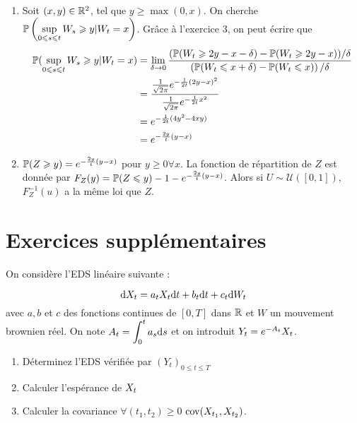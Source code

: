 \begin{enumerate}
\item Soit $(x,y) \in \R^2$, tel que $y \geq \max(0,x)$. On cherche $\dps \P\left(\supu \ws \geq y \vert \wt = x\right)$. Grâce à l'exercice 3, on peut écrire que
\begin{equation*}
\begin{split}
  \P(\supu\ws\geq y \vert \wt = x) &= \lim_{\delta \to 0} \frac{(\P(\wt \geq 2y - x - \delta) - \P(\wt \geq 2y -x))/\delta}{\left(\P(\wt \leq x + \delta) - \P(\wt \leq x)\right)/\delta} \\
  &= \frac{ \frac{1}{\sqrt{2\pi}}e^{- \frac{1}{2t}(2y-x)^2}}{ \frac{1}{\sqrt{2\pi}} e^{- \frac{1}{2t} x^2}} \\
  &= e^{- \frac{1}{2t}(4y^2 - 4xy)} \\
  &= e^{- \frac{2y}{t}(y-x)}
\end{split}
\end{equation*}

\item $\P(Z \geq y) = e^{- \frac{2y}{t}(y-x)}$ pour $y \geq 0 \forall x$. La fonction de répartition de $Z$ est donnée par $F_Z(y) = \P(Z \leq y ) - 1 - e^{- \frac{2y}{t}(y-x)}$. Alors si $U \sim \mathcal{U}([0,1])$, $F_Z^{-1}(u)$ a la même loi que $Z$.
\end{enumerate}

\section{Exercices supplémentaires}

\begin{exo}
On considère l'EDS linéaire suivante :

  \[ \der \xt = a_t \xt \der t + b_t \der t + c_t \der \wt \]
  avec $a,b$ et $c$ des fonctions continues de $[0,T]$ dans $\R$ et $W$ un mouvement brownien réel. On note $\dps A_t = \int_{0}^{t} a_s \der s$ et on introduit $Y_t = e^{-A_t} \xt$. 
\begin{enumerate}
\item Déterminez l'EDS vérifiée par $(Y_t)_{0 \leq t \leq T}$
  \item Calculer l'espérance de $\xt$
  \item Calculer la covariance $\forall (t_1, t_2) \geq 0$ $\cov(X_{t_1}, X_{t_2})$.
\end{enumerate}
\end{exo}


